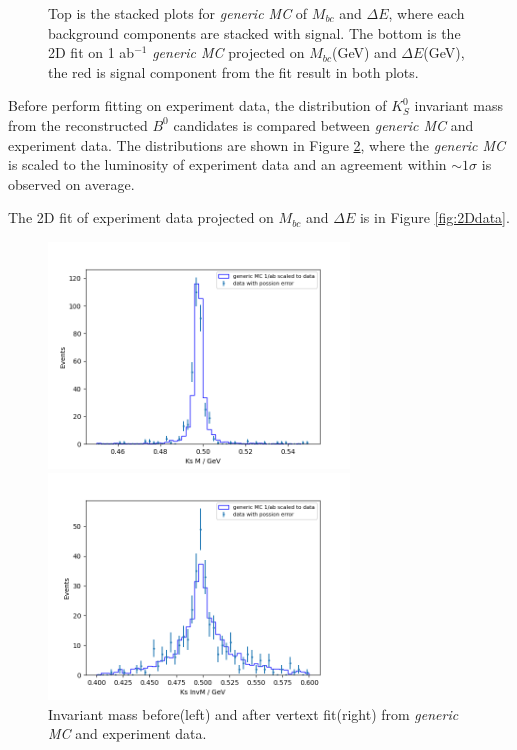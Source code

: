 \begin{figure}[H]
\begin{minipage}[b]{0.5\linewidth}
		\label{}
	\end{minipage}
	\caption{Top is the stacked plots for \textit{generic MC} of $M_{bc}$ and $\Delta E$, where each background components are stacked with signal. The bottom is the 2D fit on 1 ab$^{-1}$ \textit{generic MC} projected on $M_{bc}$(GeV) and $\Delta E$(GeV), the red is signal component from the fit result in both plots.}
	\label{fig:2Dgen}
\end{figure}

Before perform fitting on experiment data, the distribution of $K_S^0$ invariant mass from the reconstructed $B^0$ candidates is compared between \textit{generic MC} and experiment data. The distributions are shown in Figure \ref{fig:b0ksmass}, where the \textit{generic MC} is scaled to the luminosity of experiment data and an agreement within $\sim 1\sigma$ is observed on average. 

The 2D fit of experiment data projected on $M_{bc}$ and $\Delta E$ is in Figure \ref{fig:2Ddata}.  
\begin{figure}[htbp]
\begin{minipage}[b]{0.5\linewidth}
	\centering 
	\includegraphics[height=6cm]{figures/best_KsM}	
\end{minipage}
\begin{minipage}[b]{0.5\linewidth}
	\centering 
	\includegraphics[height=6cm]{figures/best_KsInvM}	
\end{minipage}
\caption{Invariant mass before(left) and after vertext fit(right) from \textit{generic MC} and experiment data.}
\label{fig:b0ksmass}
\end{figure}

